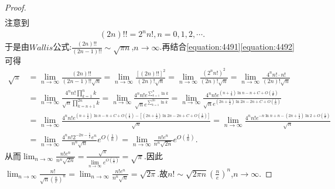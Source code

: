 \documentclass[../../main.tex]{subfiles}%
\begin{document}
\begin{proof}
\begin{align}
\end{align}
注意到
\begin{align}\label{equation:4492}
(2n)!! = 2^n n!, n = 0,1,2,\cdots.
\end{align}
于是由\(Wallis\)公式:\(\frac{(2n)!!}{(2n - 1)!!}\sim\sqrt{\pi n}\),\(n\rightarrow\infty\).再结合\eqref{equation:4491}\eqref{equation:4492}可得
\begin{align*}
\sqrt{\pi}&=\underset{n\rightarrow \infty}{\lim}\frac{\left( 2n \right) !!}{\left( 2n-1 \right) !!\sqrt{n}}=\underset{n\rightarrow \infty}{\lim}\frac{\left[ \left( 2n \right) !! \right] ^2}{\left( 2n \right) !\sqrt{n}}=\underset{n\rightarrow \infty}{\lim}\frac{\left( 2^nn! \right) ^2}{\left( 2n \right) !\sqrt{n}}=\underset{n\rightarrow \infty}{\lim}\frac{4^nn!\cdot n!}{\left( 2n \right) !\sqrt{n}}
\\
&=\underset{n\rightarrow \infty}{\lim}\frac{4^nn!\prod\limits_{k=1}^n{k}}{\sqrt{n}\prod\limits_{k=n+1}^{2n}{k}}=\underset{n\rightarrow \infty}{\lim}\frac{4^nn!e^{\sum\limits_{k=1}^n{\ln k}}}{\sqrt{n}e^{\sum\limits_{k=1}^{2n}{\ln k}}}=\underset{n\rightarrow \infty}{\lim}\frac{4^nn!e^{\left( n+\frac{1}{2} \right) \ln n-n+C+O\left( \frac{1}{n} \right)}}{\sqrt{n}e^{\left( 2n+\frac{1}{2} \right) \ln 2n-2n+C+O\left( \frac{1}{n} \right)}}
\\
&=\underset{n\rightarrow \infty}{\lim}\frac{4^nn!e^{\left( n+\frac{1}{2} \right) \ln n-n+C+O\left( \frac{1}{n} \right) -\left[ \left( 2n+\frac{1}{2} \right) \ln 2n-2n+C+O\left( \frac{1}{n} \right) \right]}}{\sqrt{n}}=\underset{n\rightarrow \infty}{\lim}\frac{4^nn!e^{-n\ln n+n-\left( 2n+\frac{1}{2} \right) \ln 2+O\left( \frac{1}{n} \right)}}{\sqrt{n}}
\\
&=\underset{n\rightarrow \infty}{\lim}\frac{4^nn!2^{-2n-\frac{1}{2}}e^n}{n^n\sqrt{n}}e^{O\left( \frac{1}{n} \right)}=\underset{n\rightarrow \infty}{\lim}\frac{n!e^n}{n^n\sqrt{2n}}e^{O\left( \frac{1}{n} \right)}.
\end{align*}
从而\(\lim_{n\rightarrow\infty}\frac{n!e^n}{n^n\sqrt{2n}}=\frac{\sqrt{\pi}}{\lim\limits_{n\rightarrow\infty}e^{O\left(\frac{1}{n}\right)}}=\sqrt{\pi}\).因此\(\lim_{n\rightarrow\infty}\frac{n!}{\sqrt{n}\left(\frac{n}{e}\right)^n}=\lim_{n\rightarrow\infty}\frac{n!e^n}{n^n\sqrt{n}}=\sqrt{2\pi}\).故\(n!\sim\sqrt{2\pi n}\left(\frac{n}{e}\right)^n\),\(n\rightarrow\infty\).

\end{proof}
\end{document}
